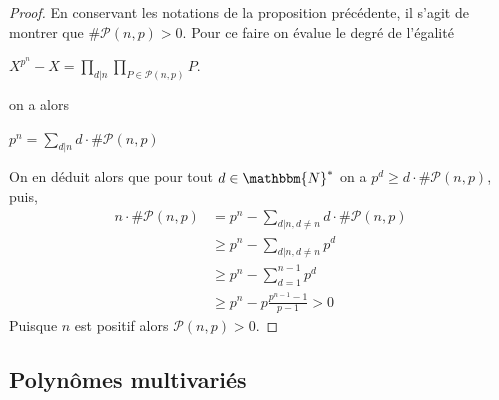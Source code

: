 \documentclass[12pt]{article}
\theoremstyle{remark}\newtheorem{note}{Note}
\theoremstyle{remark}\newtheorem{nota}{Notation}
\newcommand{\N}{\mathbbm{N}}
\theoremstyle{definition}
\begin{document}
\begin{proof}
En conservant les notations de la proposition précédente, il s'agit de montrer que $\# \mathcal{P} (n,p) > 0$. Pour ce faire on évalue le degré de l'égalité
\begin{center}
$\displaystyle X^{p^n} - X = \prod_{d | n} \prod_{P \in \mathcal{P}(n,p)} P.$
\end{center}
on a alors
\begin{center}
$\displaystyle p^n = \sum_{d | n} d \cdot \# \mathcal{P} (n,p)$
\end{center}
On en déduit alors que pour tout $d \in \N^{*}$ on a $p^d \geq d \cdot \# \mathcal{P} (n,p)$, puis,
\begin{align*}
\displaystyle
n \cdot \# \mathcal{P} (n,p) &= p^n - \sum_{d | n , d \neq n} d \cdot \# \mathcal{P} (n,p)\\
&\geq p^n - \sum_{d | n , d \neq n} p^d\\
&\geq p^n - \sum_{d =1}^{n-1} p^d\\
&\geq p^n - p \frac{p^{n-1} - 1}{p-1} > 0
\end{align*}
Puisque $n$ est positif alors $\mathcal{P} (n,p) > 0$.
\end{proof}




\subsection{Polynômes multivariés}


\end{document}
